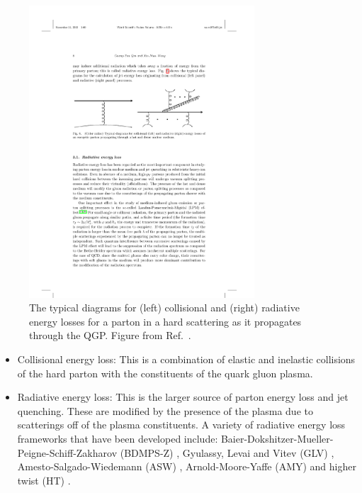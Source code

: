 \begin{figure}[htbp]
\begin{center}
\includegraphics[width=0.75\textwidth]{figures/theory/jetEnergyLoss}
\caption{The typical diagrams for (left) collisional and (right) radiative energy losses for a parton in a hard scattering as it propagates through the QGP.
Figure from Ref.~\cite{Qin:2015srf}.}
\label{fig:jetEnergyLoss}
\end{center}
\end{figure}

\begin{itemize}
\item Collisional energy loss: This is a combination of elastic and inelastic collisions of the hard parton with the constituents of the quark gluon plasma.

\item Radiative energy loss: This is the larger source of parton energy loss and jet quenching.
These are modified by the presence of the plasma due to scatterings off of the plasma constituents.
A variety of radiative energy loss frameworks that have been developed include: Baier-Dokshitzer-Mueller-Peigne-Schiff-Zakharov (BDMPS-Z) \cite{BAIER1997291}, Gyulassy, Levai and Vitev (GLV) \cite{Gyulassy:1999zd}, Amesto-Salgado-Wiedemann (ASW) \cite{Wiedemann:2000za},  Arnold-Moore-Yaffe (AMY) \cite{Arnold:2001ba} and higher twist (HT) \cite{Guo:2000nz}.
\end{itemize}

